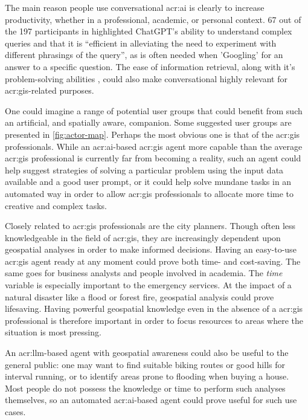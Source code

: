 The main reason people use conversational \acrshort{acr:ai} is clearly to increase productivity, whether in a professional, academic, or personal context. 67 out of the 197 participants in \cite[18]{skjuveWhyPeopleUse2023} highlighted ChatGPT's ability to understand complex queries and that it is \enquote{efficient in alleviating the need to experiment with different phrasings of the query}, as is often needed when 'Googling' for an answer to a specific question. The ease of information retrieval, along with it's problem-solving abilities \citep[20]{skjuveWhyPeopleUse2023}, could also make conversational  highly relevant for \acrshort{acr:gis}-related purposes.

One could imagine a range of potential user groups that could benefit from such an artificial, and spatially aware, companion. Some suggested user groups are presented in \autoref{fig:actor-map}. Perhaps the most obvious one is that of the \acrshort{acr:gis} professionals. While an \acrshort{acr:ai}-based \acrshort{acr:gis} agent more capable than the average \acrshort{acr:gis} professional is currently far from becoming a reality, such an agent could help suggest strategies of solving a particular problem using the input data available and a good user prompt, or it could help solve mundane tasks in an automated way in order to allow \acrshort{acr:gis} professionals to allocate more time to creative and complex tasks.

Closely related to \acrshort{acr:gis} professionals are the city planners. Though often less knowledgeable in the field of \acrshort{acr:gis}, they are increasingly dependent upon geospatial analyses in order to make informed decisions. Having an easy-to-use \acrshort{acr:gis} agent ready at any moment could prove both time- and cost-saving. The same goes for business analysts and people involved in academia. The \textit{time} variable is especially important to the emergency services. At the impact of a natural disaster like a flood or forest fire, geospatial analysis could prove lifesaving. Having powerful geospatial knowledge even in the absence of a \acrshort{acr:gis} professional is therefore important in order to focus resources to areas where the situation is most pressing.

An \acrshort{acr:llm}-based agent with geospatial awareness could also be useful to the general public: one may want to find suitable biking routes or good hills for interval running, or to identify areas prone to flooding when buying a house. Most people do not possess the knowledge or time to perform such analyses themselves, so an automated \acrshort{acr:ai}-based agent could prove useful for such use cases.



